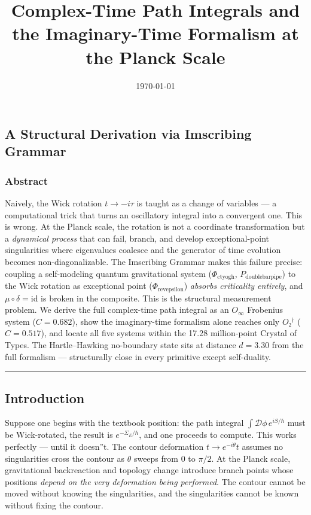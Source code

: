 \documentclass[12pt,a4paper]{article}
\begin{document}
\title{Complex-Time Path Integrals and the Imaginary-Time Formalism at the Planck Scale}
\date{\today}

\maketitle

\subsection{A Structural Derivation via Imscribing Grammar}

\subsubsection{Abstract}

Naively, the Wick rotation $t \to -i\tau$ is taught as a change of variables --- a computational trick that turns an oscillatory integral into a convergent one. This is wrong. At the Planck scale, the rotation is not a coordinate transformation but a \emph{dynamical process} that can fail, branch, and develop exceptional-point singularities where eigenvalues coalesce and the generator of time evolution becomes non-diagonalizable. The Imscribing Grammar makes this failure precise: coupling a self-modeling quantum gravitational system ($\Phi_{\text{ctyogh}}$, $P_{\text{doublebarpipe}}$) to the Wick rotation as exceptional point ($\Phi_{\text{revepsilon}}$) \emph{absorbs criticality entirely}, and $\mu \circ \delta = \text{id}$ is broken in the composite. This is the structural measurement problem. We derive the full complex-time path integral as an $O_{\infty}$ Frobenius system ($C = 0.682$), show the imaginary-time formalism alone reaches only $O₂^\dagger$ ($C = 0.517$), and locate all five systems within the 17.28 million-point Crystal of Types. The Hartle--Hawking no-boundary state sits at distance $d = 3.30$ from the full formalism --- structurally close in every primitive except self-duality.

\begin{center}
\rule{0.5\textwidth}{0.4pt}
\end{center}

\subsection{Introduction}

Suppose one begins with the textbook position: the path integral $\int \mathcal{D}\phi\, e^{iS/\hbar}$ must be Wick-rotated, the result is $e^{-Σ_E/\hbar}$, and one proceeds to compute. This works perfectly --- until it doesn''t. The contour deformation $t \to e^{-i\theta}t$ assumes no singularities cross the contour as $\theta$ sweeps from $0$ to $\pi/2$. At the Planck scale, gravitational backreaction and topology change introduce branch points whose positions \emph{depend on the very deformation being performed}. The contour cannot be moved without knowing the singularities, and the singularities cannot be known without fixing the contour.
\end{document}
